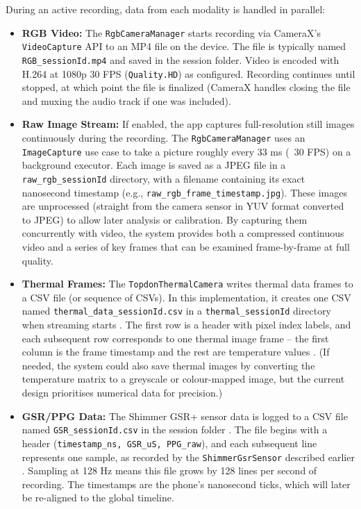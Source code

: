 During an active recording, data from each modality is handled in parallel:
\begin{itemize}
    \item \textbf{RGB Video:} The \texttt{RgbCameraManager} starts recording via CameraX's \texttt{VideoCapture} API to an MP4 file on the device. The file is typically named \texttt{RGB\_\<sessionId\>.mp4} and saved in the session folder. Video is encoded with H.264 at 1080p 30 FPS (\texttt{Quality.HD}) as configured. Recording continues until stopped, at which point the file is finalized (CameraX handles closing the file and muxing the audio track if one was included).
    \item \textbf{Raw Image Stream:} If enabled, the app captures full-resolution still images continuously during the recording. The \texttt{RgbCameraManager} uses an \texttt{ImageCapture} use case to take a picture roughly every 33 ms (~30 FPS) on a background executor. Each image is saved as a JPEG file in a \texttt{raw\_rgb\_\<sessionId\>} directory, with a filename containing its exact nanosecond timestamp (e.g., \texttt{raw\_rgb\_frame\_\<timestamp\>.jpg}). These images are unprocessed (straight from the camera sensor in YUV format converted to JPEG) to allow later analysis or calibration. By capturing them concurrently with video, the system provides both a compressed continuous video and a series of key frames that can be examined frame-by-frame at full quality.
    \item \textbf{Thermal Frames:} The \texttt{TopdonThermalCamera} writes thermal data frames to a CSV file (or sequence of CSVs). In this implementation, it creates one CSV named \texttt{thermal\_data\_\<sessionId\>.csv} in a \texttt{thermal\_\<sessionId\>} directory when streaming starts \cite{ref16}. The first row is a header with pixel index labels, and each subsequent row corresponds to one thermal image frame -- the first column is the frame timestamp and the rest are temperature values \cite{ref16}. (If needed, the system could also save thermal images by converting the temperature matrix to a greyscale or colour-mapped image, but the current design prioritises numerical data for precision.)
    \item \textbf{GSR/PPG Data:} The Shimmer GSR+ sensor data is logged to a CSV file named \texttt{GSR\_\<sessionId\>.csv} in the session folder \cite{ref15}. The file begins with a header (\texttt{timestamp\_ns, GSR\_uS, PPG\_raw}), and each subsequent line represents one sample, as recorded by the \texttt{ShimmerGsrSensor} described earlier \cite{ref15}. Sampling at 128 Hz means this file grows by 128 lines per second of recording. The timestamps are the phone's nanosecond ticks, which will later be re-aligned to the global timeline.

\end{itemize}
